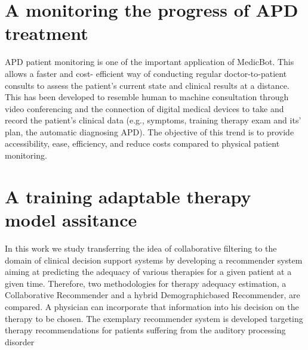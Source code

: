 \documentclass[letterpaper%
, twoside%
, 12pt%
,these%
, english%
,creativecommons,hyperref%
]{thETS}
\begin{document}
\section{ A monitoring the progress of APD treatment}
APD patient monitoring is one of the important application of MedicBot. This allows a faster
and cost- efficient way of conducting regular doctor-to-patient consults to assess the patient’s
current state and clinical results at a distance. This has been developed to resemble human to
machine consultation through video conferencing and the connection of digital medical devices
to take and record the patient’s clinical data (e.g., symptoms, training therapy exam and its’
plan, the automatic diagnosing APD). The objective of this trend is to provide accessibility,
ease, efficiency, and reduce costs compared to physical patient monitoring.

\section{A training adaptable therapy model assitance}
In this work we study transferring the idea of collaborative filtering to the domain of clinical
decision support systems by developing a recommender system aiming at predicting the adequacy
of various therapies for a given patient at a given time. Therefore, two methodologies for
therapy adequacy estimation, a Collaborative Recommender and a hybrid Demographicbased
Recommender, are compared. A physician can incorporate that information into his decision
on the therapy to be chosen. The exemplary recommender system is developed targeting therapy
recommendations for patients suffering from the auditory processing disorder



\end{document}
